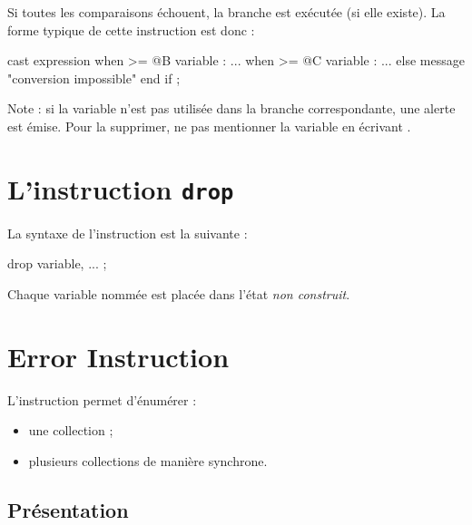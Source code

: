 Si toutes les comparaisons échouent, la branche  est exécutée (si elle existe). La forme typique de cette instruction est donc :


\begin{galgascode}
cast expression
when >= @B variable :
  ...
when >= @C variable :
  ...
else
  message "conversion impossible"
end if ;
\end{galgascode}

Note : si la variable  n'est pas utilisée dans la branche correspondante, une alerte est émise. Pour la supprimer, ne pas mentionner la variable en écrivant .









\section{L'instruction \texttt{drop}}

La syntaxe de l'instruction  est la suivante :
{
\begin{galgascode}
drop variable, ... ;
\end{galgascode}
}

Chaque variable nommée est placée dans l'état \emph{non construit}.

\section{Error Instruction}








L'instruction  permet d'énumérer :
\begin{itemize}
  \item une collection ;
  \item plusieurs collections de manière synchrone.
\end{itemize}

\subsection{Présentation}

